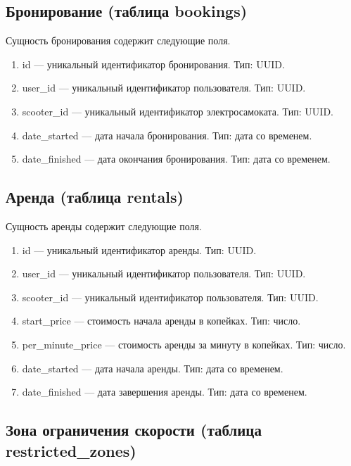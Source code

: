 \subsection{Бронирование (таблица bookings)}

Сущность бронирования содержит следующие поля.

\begin{enumerate}
    \item id --- уникальный идентификатор бронирования. Тип: UUID.
    \item user\_id --- уникальный идентификатор пользователя. Тип: UUID.
    \item scooter\_id --- уникальный идентификатор электросамоката. Тип: UUID.
    \item date\_started --- дата начала бронирования. Тип: дата со временем.
    \item date\_finished --- дата окончания бронирования. Тип: дата со временем.
\end{enumerate}

\subsection{Аренда (таблица rentals)}

Сущность аренды содержит следующие поля.

\begin{enumerate}
    \item id --- уникальный идентификатор аренды. Тип: UUID.
    \item user\_id --- уникальный идентификатор пользователя. Тип: UUID.
    \item scooter\_id --- уникальный идентификатор пользователя. Тип: UUID.
    \item start\_price --- стоимость начала аренды в копейках. Тип: число.
    \item per\_minute\_price --- стоимость аренды за минуту в копейках. Тип: число.
    \item date\_started --- дата начала аренды. Тип: дата со временем.
    \item date\_finished --- дата завершения аренды. Тип: дата со временем.
\end{enumerate}

\subsection{Зона ограничения скорости (таблица restricted\_zones)}

